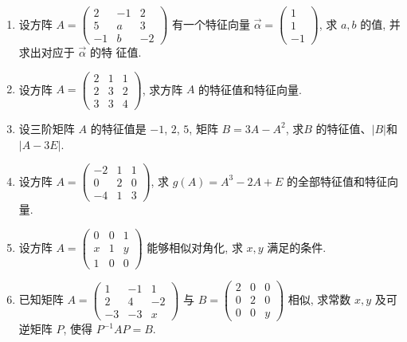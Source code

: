 \begin{enumerate}
	
	\item 设方阵 $A =
	\begin{pmatrix}
		2 & -1 & 2 \\
		5 & a & 3 \\
		-1 & b & -2
	\end{pmatrix}$ 有一个特征向量 $\vec{\alpha} = \begin{pmatrix} 1 \\ 1 \\ -1 \end{pmatrix}$, 求 $a, b$ 的值, 并求出对应于 $\vec{\alpha}$ 的特
	征值.
	
	
	\item 设方阵 $A =
	\begin{pmatrix}
		2 & 1 & 1 \\
		2 & 3 & 2 \\
		3 & 3 & 4
	\end{pmatrix}$, 求方阵 $A$ 的特征值和特征向量.
	
	
	
	\item 设三阶矩阵 $A$ 的特征值是 $-1$, $2$, $5$, 矩阵 $B = 3A - A^2$, 求$B$ 的特征值、$|B|$和$|A-3E|$.
	
	
	\item 设方阵 $A =
	\begin{pmatrix}
		-2 & 1 & 1 \\
		0 & 2 & 0 \\
		-4 & 1 & 3
	\end{pmatrix}$, 求 $g(A) = A^3 - 2A + E$ 的全部特征值和特征向量.
	
	
	\item 设方阵 $A =
	\begin{pmatrix}
		0 & 0 & 1 \\
		x & 1 & y \\
		1 & 0 & 0
	\end{pmatrix}$ 能够相似对角化, 求 $x, y$ 满足的条件.
	
	
	
	\item 已知矩阵 $A =
	\begin{pmatrix}
		1 & -1 & 1 \\
		2 & 4 & -2 \\
		-3 & -3 & x
	\end{pmatrix}$ 与 $B =
	\begin{pmatrix}
		2 & 0 & 0 \\
		0 & 2 & 0 \\
		0 & 0 & y
	\end{pmatrix}$ 相似, 求常数 $x, y$ 及可逆矩阵 $P$, 使得
	$P^{-1}AP = B$.
	

\end{enumerate}
